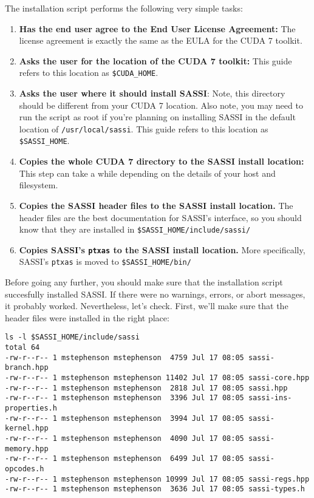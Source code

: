 The installation script performs the following very simple tasks:
\begin{enumerate}
\item {\bf Has the end user agree to the End User License Agreement:}
  The license agreement is exactly the same as the EULA for the CUDA
  7 toolkit.
\item {\bf Asks the user for the location of the CUDA 7 toolkit:}
  This guide refers to this location as \texttt{\$CUDA\_HOME}.
\item {\bf Asks the user where it should install SASSI}: Note, this
  directory should be different from your CUDA 7 location.  Also note,
  you may need to run the script as root if you're planning on
  installing SASSI in the default location of
  \texttt{/usr/local/sassi}.  This guide refers to this location as
  \texttt{\$SASSI\_HOME}. 
\item {\bf Copies the whole CUDA 7 directory to the SASSI install
  location:} This step can take a while depending on the details of
  your host and filesystem.
\item {\bf Copies the SASSI header files to the SASSI install
  location.}  The header files are the best documentation for SASSI's
  interface, so you should know that they are installed in
  \lstinline[style=BashInputStyle]´$SASSI_HOME/include/sassi/´
\item {\bf Copies SASSI's \texttt{ptxas} to the SASSI install
  location.}  More specifically, SASSI's \texttt{ptxas} is moved to
  \lstinline[style=BashInputStyle]´$SASSI_HOME/bin/´
\end{enumerate}

Before going any further, you should make sure that the installation
script succesfully installed SASSI.  If there were no warnings,
errors, or abort messages, it probably worked.  Nevertheless, let's
check.  First, we'll make sure that the header files were installed in
the right place:
\begin{lstlisting}[style=BashInputStyle]
ls -l $SASSI_HOME/include/sassi
total 64 
-rw-r--r-- 1 mstephenson mstephenson  4759 Jul 17 08:05 sassi-branch.hpp
-rw-r--r-- 1 mstephenson mstephenson 11402 Jul 17 08:05 sassi-core.hpp
-rw-r--r-- 1 mstephenson mstephenson  2818 Jul 17 08:05 sassi.hpp
-rw-r--r-- 1 mstephenson mstephenson  3396 Jul 17 08:05 sassi-ins-properties.h
-rw-r--r-- 1 mstephenson mstephenson  3994 Jul 17 08:05 sassi-kernel.hpp
-rw-r--r-- 1 mstephenson mstephenson  4090 Jul 17 08:05 sassi-memory.hpp
-rw-r--r-- 1 mstephenson mstephenson  6499 Jul 17 08:05 sassi-opcodes.h
-rw-r--r-- 1 mstephenson mstephenson 10999 Jul 17 08:05 sassi-regs.hpp
-rw-r--r-- 1 mstephenson mstephenson  3636 Jul 17 08:05 sassi-types.h
\end{lstlisting}

